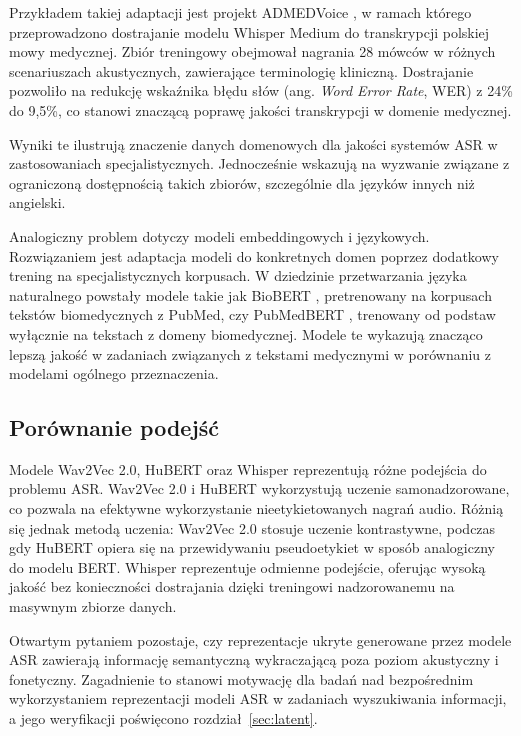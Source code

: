 Przykładem takiej adaptacji jest projekt ADMEDVoice \cite{ADMEDVoice}, w ramach którego przeprowadzono dostrajanie modelu Whisper Medium do transkrypcji polskiej mowy medycznej. Zbiór treningowy obejmował nagrania 28 mówców w różnych scenariuszach akustycznych, zawierające terminologię kliniczną. Dostrajanie pozwoliło na redukcję wskaźnika błędu słów (ang. \textit{Word Error Rate}, WER) z 24\% do 9,5\%, co stanowi znaczącą poprawę jakości transkrypcji w domenie medycznej.

Wyniki te ilustrują znaczenie danych domenowych dla jakości systemów ASR w zastosowaniach specjalistycznych. Jednocześnie wskazują na wyzwanie związane z ograniczoną dostępnością takich zbiorów, szczególnie dla języków innych niż angielski.

Analogiczny problem dotyczy modeli embeddingowych i językowych. Rozwiązaniem jest adaptacja modeli do konkretnych domen poprzez dodatkowy trening na specjalistycznych korpusach. W dziedzinie przetwarzania języka naturalnego powstały modele takie jak BioBERT \cite{lee2020biobert}, pretrenowany na korpusach tekstów biomedycznych z PubMed, czy PubMedBERT \cite{gu2021domain}, trenowany od podstaw wyłącznie na tekstach z domeny biomedycznej. Modele te wykazują znacząco lepszą jakość w zadaniach związanych z tekstami medycznymi w porównaniu z modelami ogólnego przeznaczenia.

\subsection{Porównanie podejść}

Modele Wav2Vec 2.0, HuBERT oraz Whisper reprezentują różne podejścia do problemu ASR. Wav2Vec 2.0 i HuBERT wykorzystują uczenie samonadzorowane, co pozwala na efektywne wykorzystanie nieetykietowanych nagrań audio. Różnią się jednak metodą uczenia: Wav2Vec 2.0 stosuje uczenie kontrastywne, podczas gdy HuBERT opiera się na przewidywaniu pseudoetykiet w sposób analogiczny do modelu BERT. Whisper reprezentuje odmienne podejście, oferując wysoką jakość bez konieczności dostrajania dzięki treningowi nadzorowanemu na masywnym zbiorze danych.

Otwartym pytaniem pozostaje, czy reprezentacje ukryte generowane przez modele ASR zawierają informację semantyczną wykraczającą poza poziom akustyczny i fonetyczny. Zagadnienie to stanowi motywację dla badań nad bezpośrednim wykorzystaniem reprezentacji modeli ASR w zadaniach wyszukiwania informacji, a jego weryfikacji poświęcono rozdział~\ref{sec:latent}.


